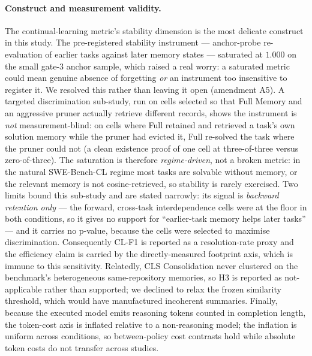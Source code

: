 \paragraph{Construct and measurement validity.}
The continual-learning metric's stability dimension is the most delicate construct in this
study. The pre-registered stability instrument --- anchor-probe re-evaluation of earlier
tasks against later memory states --- saturated at $1.000$ on the small gate-3 anchor
sample, which raised a real worry: a saturated metric could mean genuine absence of
forgetting \emph{or} an instrument too insensitive to register it. We resolved this rather
than leaving it open (amendment A5). A targeted discrimination sub-study, run on cells
selected so that Full Memory and an aggressive pruner actually retrieve different records,
shows the instrument is \emph{not} measurement-blind: on cells where Full retained and
retrieved a task's own solution memory while the pruner had evicted it, Full re-solved the
task where the pruner could not (a clean existence proof of one cell at three-of-three versus
zero-of-three). The saturation is therefore \emph{regime-driven}, not a broken metric: in the
natural SWE-Bench-CL regime most tasks are solvable without memory, or the relevant memory is
not cosine-retrieved, so stability is rarely exercised. Two limits bound this sub-study and
are stated narrowly: its signal is \emph{backward retention only} --- the forward, cross-task
interdependence cells were at the floor in both conditions, so it gives no support for
``earlier-task memory helps later tasks'' --- and it carries no p-value, because the cells
were selected to maximise discrimination. Consequently CL-F1 is reported as a
resolution-rate proxy and the efficiency claim is carried by the directly-measured footprint
axis, which is immune to this sensitivity. Relatedly, CLS Consolidation never clustered on
the benchmark's heterogeneous same-repository memories, so H3 is reported as not-applicable
rather than supported; we declined to relax the frozen similarity threshold, which would have
manufactured incoherent summaries. Finally, because the executed model emits reasoning tokens
counted in completion length, the token-cost axis is inflated relative to a non-reasoning
model; the inflation is uniform across conditions, so between-policy cost contrasts hold
while absolute token costs do not transfer across studies.

